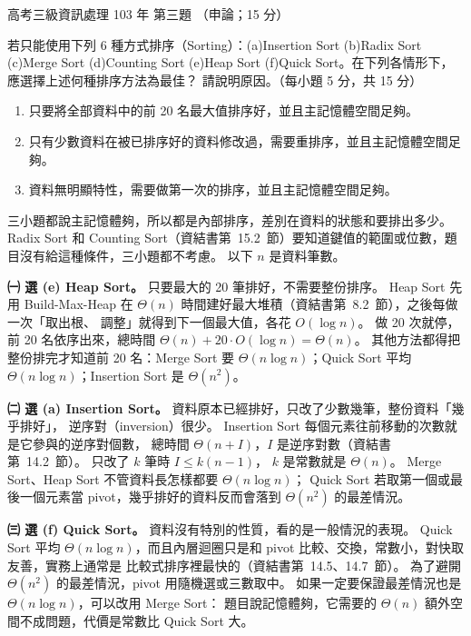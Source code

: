 \begin{pastexam}[label={px:gk3-103-ds-03}]{高考三級資訊處理 103 年 第三題}
（申論；15 分）

若只能使用下列 6 種方式排序（Sorting）：(a)Insertion Sort (b)Radix Sort (c)Merge Sort
(d)Counting Sort (e)Heap Sort (f)Quick Sort。在下列各情形下，應選擇上述何種排序方法為最佳？
請說明原因。（每小題 5 分，共 15 分）
\begin{enumerate}[leftmargin=2.2em]
\item[㈠] 只要將全部資料中的前 20 名最大值排序好，並且主記憶體空間足夠。
\item[㈡] 只有少數資料在被已排序好的資料修改過，需要重排序，並且主記憶體空間足夠。
\item[㈢] 資料無明顯特性，需要做第一次的排序，並且主記憶體空間足夠。
\end{enumerate}
\end{pastexam}

\begin{pastsoln}
三小題都說主記憶體夠，所以都是內部排序，差別在資料的狀態和要排出多少。 Radix Sort 和
Counting Sort（資結書第~15.2~節）要知道鍵值的範圍或位數，題目沒有給這種條件，三小題都不考慮。
以下 $n$ 是資料筆數。

\textbf{㈠ 選 (e) Heap Sort。} 只要最大的 20 筆排好，不需要整份排序。 Heap Sort 先用
Build-Max-Heap 在 $\Theta(n)$ 時間建好最大堆積（資結書第~8.2~節），之後每做一次「取出根、
調整」就得到下一個最大值，各花 $O(\log n)$。 做 20 次就停，前 20 名依序出來，總時間
$\Theta(n) + 20 \cdot O(\log n) = \Theta(n)$。 其他方法都得把整份排完才知道前 20 名：Merge Sort
要 $\Theta(n \log n)$；Quick Sort 平均 $\Theta(n \log n)$；Insertion Sort 是 $\Theta(n^2)$。

\textbf{㈡ 選 (a) Insertion Sort。} 資料原本已經排好，只改了少數幾筆，整份資料「幾乎排好」，
逆序對（inversion）很少。 Insertion Sort 每個元素往前移動的次數就是它參與的逆序對個數，
總時間 $\Theta(n + I)$，$I$ 是逆序對數（資結書第~14.2~節）。 只改了 $k$ 筆時 $I \le k(n-1)$，
$k$ 是常數就是 $\Theta(n)$。 Merge Sort、Heap Sort 不管資料長怎樣都要 $\Theta(n \log n)$；
Quick Sort 若取第一個或最後一個元素當 pivot，幾乎排好的資料反而會落到 $\Theta(n^2)$ 的最差情況。

\textbf{㈢ 選 (f) Quick Sort。} 資料沒有特別的性質，看的是一般情況的表現。 Quick Sort 平均
$\Theta(n \log n)$，而且內層迴圈只是和 pivot 比較、交換，常數小，對快取友善，實務上通常是
比較式排序裡最快的（資結書第~14.5、14.7~節）。 為了避開 $\Theta(n^2)$ 的最差情況，pivot
用隨機選或三數取中。 如果一定要保證最差情況也是 $\Theta(n \log n)$，可以改用 Merge Sort：
題目說記憶體夠，它需要的 $\Theta(n)$ 額外空間不成問題，代價是常數比 Quick Sort 大。
\end{pastsoln}
